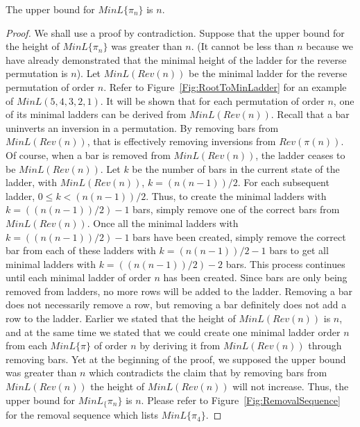    \begin{lemma}
       The upper bound for $MinL\{\pi_{n}\}$ is $n$.
   \end{lemma}
   \begin{proof}
       We shall use a proof by contradiction. Suppose that the upper bound for the height of $MinL\{\pi_{n}\}$ was greater than $n$. (It cannot be less than $n$ because 
       we have already demonstrated that the minimal height of the ladder for the reverse permutation is $n$). Let $MinL(Rev(n))$ be the 
       minimal ladder for the reverse permutation of order $n$. Refer to Figure~\ref{Fig:RootToMinLadder} for an example of $MinL(5,4,3,2,1)$. 
       It will be shown that for each permutation of order $n$, one of its minimal ladders can be derived from $MinL(Rev(n))$.
       Recall that a bar uninverts an inversion in a permutation. By removing bars from $MinL(Rev(n))$, that is effectively removing 
       inversions from $Rev(\pi(n))$. Of course, when a bar is removed from  $MinL(Rev(n))$, the ladder ceases to be $MinL(Rev(n))$. 
       Let $k$ be the number of bars in the current state of the ladder, with $MinL(Rev(n))$, $k=(n(n-1))/2$. For each subsequent 
       ladder, $0 \leq k < (n(n-1))/2$. Thus, to create the minimal ladders with $k=((n(n-1))/2)-1$ bars, 
       simply remove one of the correct bars from $MinL(Rev(n))$. 
       Once all the minimal ladders with  $k=((n(n-1))/2)-1$ bars have been created, simply remove the correct bar from each of these ladders with 
        $k=(n(n-1))/2-1$ bars to get all minimal ladders with  $k=((n(n-1))/2)-2$ bars.
       This process continues until each minimal ladder of order $n$ has been created. 
       Since bars are only being removed from ladders, no more rows 
       will be added to the ladder. 
       Removing a bar does not necessarily remove a row, but removing a bar definitely does not add a row to the ladder. 
       Earlier we stated that 
       the height of $MinL(Rev(n))$ is $n$, and at the same time we stated that we could create one minimal ladder order $n$ 
       from each $MinL\{\pi\}$ of order $n$
       by deriving it from $MinL(Rev(n))$ 
       through removing bars. Yet at the beginning of the proof, 
       we supposed the upper bound was greater than $n$ which contradicts the claim that by removing bars from  
       $MinL(Rev(n))$ the height of $MinL(Rev(n))$ will not increase. Thus, the upper bound for $MinL_\{\pi_{n}\}$ is $n$. 
       Please refer to Figure~\ref{Fig:RemovalSequence} for the removal sequence which lists $MinL\{\pi_{4}\}$. 

   \end{proof}
